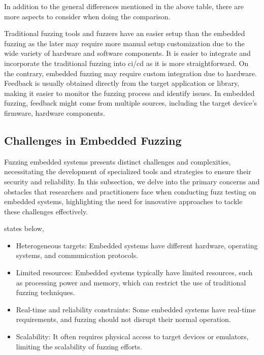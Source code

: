 In addition to the general differences mentioned in the above table, there are more aspects to consider
when doing the comparison.

Traditional fuzzing tools and fuzzers have an easier setup than the embedded fuzzing as the later may
require more manual setup customization due to the wide variety of hardware and software components.
It is easier to integrate and incorporate the traditional fuzzing into \acrlong{ci/cd} as it is more
straightforward. On the contrary, embedded fuzzing may require custom integration due to hardware.
Feedback is usually obtained directly from the target application or library, making it easier to
monitor the fuzzing process and identify issues. In embedded fuzzing, feedback might come
from multiple sources, including the target device's firmware, hardware components.

\subsection{Challenges in Embedded Fuzzing}
Fuzzing embedded systems presents distinct challenges and complexities,
necessitating the development of specialized tools and strategies to ensure
their security and reliability. In this subsection, we delve into the primary
concerns and obstacles that researchers and practitioners face when conducting
fuzz testing on embedded systems, highlighting the need for innovative approaches
to tackle these challenges effectively.

 states below,
\begin{itemize}
\item Heterogeneous targets: Embedded systems have different hardware,
operating systems, and communication protocols\cite{yun2022fuzzing}.
\item Limited resources: Embedded systems typically have limited resources,
such as processing power and memory, which can restrict the use of
traditional fuzzing techniques\cite{yun2022fuzzing}.
\item Real-time and reliability constraints: Some embedded systems have
real-time requirements, and fuzzing should not disrupt their normal operation\cite{yun2022fuzzing}.
\item Scalability: It often requires physical access to target devices or
emulators, limiting the scalability of fuzzing efforts\cite{yun2022fuzzing}.
\end{itemize}

